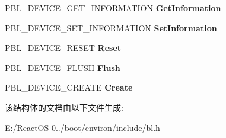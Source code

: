 \begin{DoxyCompactItemize}
P\+B\+L\+\_\+\+D\+E\+V\+I\+C\+E\+\_\+\+G\+E\+T\+\_\+\+I\+N\+F\+O\+R\+M\+A\+T\+I\+ON {\bfseries Get\+Information}
\item 
\mbox{\label{struct___b_l___d_e_v_i_c_e___c_a_l_l_b_a_c_k_s_a750c645a1ce30a67dae7b9b67b4d3098}} 
P\+B\+L\+\_\+\+D\+E\+V\+I\+C\+E\+\_\+\+S\+E\+T\+\_\+\+I\+N\+F\+O\+R\+M\+A\+T\+I\+ON {\bfseries Set\+Information}
\item 
\mbox{\label{struct___b_l___d_e_v_i_c_e___c_a_l_l_b_a_c_k_s_a1759a2f667986bdcd593c26571f5d0ae}} 
P\+B\+L\+\_\+\+D\+E\+V\+I\+C\+E\+\_\+\+R\+E\+S\+ET {\bfseries Reset}
\item 
\mbox{\label{struct___b_l___d_e_v_i_c_e___c_a_l_l_b_a_c_k_s_a12b8d358d4e801e6fb964f36e75328c2}} 
P\+B\+L\+\_\+\+D\+E\+V\+I\+C\+E\+\_\+\+F\+L\+U\+SH {\bfseries Flush}
\item 
\mbox{\label{struct___b_l___d_e_v_i_c_e___c_a_l_l_b_a_c_k_s_ad08aa569923c5f1944ffe53944b9399d}} 
P\+B\+L\+\_\+\+D\+E\+V\+I\+C\+E\+\_\+\+C\+R\+E\+A\+TE {\bfseries Create}
\end{DoxyCompactItemize}


该结构体的文档由以下文件生成\+:\begin{DoxyCompactItemize}
\item 
E\+:/\+React\+O\+S-\/0../boot/environ/include/bl.\+h\end{DoxyCompactItemize}

